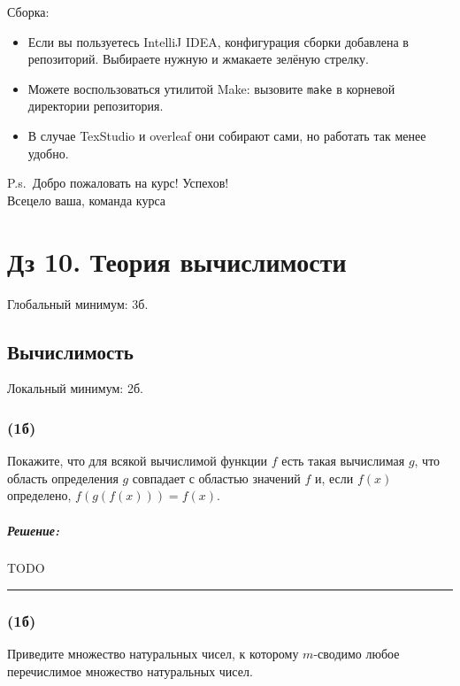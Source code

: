 \documentclass{article}
\newenvironment{proof}{\subparagraph{\hspace{-1em}Решение:\newline}}{\par\noindent\rule{\textwidth}{0.4pt}}
\begin{document}
    Сборка:
    \begin{itemize}
        \item Если вы пользуетесь IntelliJ IDEA, конфигурация сборки добавлена в репозиторий.
        Выбираете нужную и жмакаете зелёную стрелку.
        \item Можете воспользоваться утилитой Make: вызовите \texttt{make} в корневой директории репозитория.
        \item В случае TexStudio и overleaf они собирают сами, но работать так менее удобно.
    \end{itemize}

    \begin{flushright}
        P.s.\ Добро пожаловать на курс!
        Успехов! \\
        Всецело ваша, команда курса
    \end{flushright}

    \newpage


    \section*{Дз 10. Теория вычислимости}

    Глобальный минимум: 3б.

    \subsection{Вычислимость}

    Локальный минимум: 2б.

    \subsubsection{(1б)}

    Покажите, что для всякой вычислимой функции $f$ есть такая вычислимая $g$, что область определения $g$ совпадает с областью значений $f$ и, если $f(x)$ определено, $f(g(f(x))) = f(x)$.

    \begin{proof}
        TODO %
    \end{proof}

    \subsubsection{(1б)}

    Приведите множество натуральных чисел, к которому $m$-сводимо любое перечислимое множество натуральных чисел.
\end{document}
